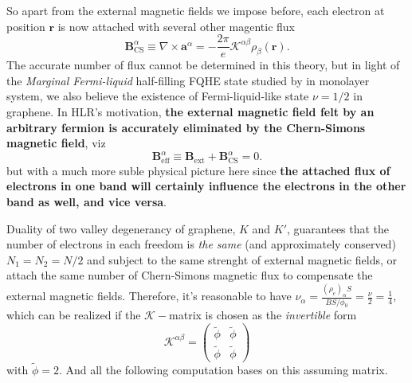 \documentclass[bachelor,english,numbers]{ustcthesis}
\begin{document}
		So apart from the external magnetic fields we impose before, each electron at position $\bm{r}$ is now attached with several other magentic flux
		\begin{equation}\label{2.2.5}
			\bm{B}^\alpha_{\text{CS}}\equiv\nabla\times\bm{a}^\alpha=-\dfrac{2\pi}{e}\mathcal{K}^{\alpha \beta}\rho_\beta(\bm{r}).
		\end{equation}
		The accurate number of flux cannot be determined in this theory, but in light of the \emph{Marginal Fermi-liquid} half-filling FQHE state studied by \cite{Halperin1995Theory} in monolayer system, we also believe the existence of Fermi-liquid-like state $\nu=1/2$ in graphene. In HLR's motivation, {\bf the external magnetic field felt by an arbitrary fermion is accurately eliminated by the Chern-Simons magnetic field}, viz
		\begin{equation}\label{2.2.6}
			\bm{B}^\alpha_{\text{eff}}\equiv\bm{B}_{\text{ext}}+\bm{B}^\alpha_{\text{CS}}=0.
		\end{equation}
		but with a much more suble physical picture here since {\bf the attached flux of electrons in one band will certainly influence the electrons in the other band as well, and vice versa}.\par
		Duality of two valley degenerancy of graphene, $K$ and $K'$, guarantees that the number of electrons in each freedom is \emph{the same} (and approximately conserved) $N_1=N_2=N/2$ and subject to the same strenght of external magnetic fields, or attach the same number of Chern-Simons magnetic flux to compensate the external magnetic fields. Therefore, it's reasonable to have $\nu_\alpha=\frac{(\rho_e)_{\alpha}S}{BS/\phi_0}=\frac{\nu}{2}=\frac{1}{4}$, which can be realized if the $\mathcal{K}-$matrix is chosen as the \emph{invertible} form
		\begin{equation}\label{2.2.7}
			\mathcal{K}^{\alpha \beta}=\left(\begin{array}{cc}
				\widetilde{\phi}  & \widetilde{\phi}  \\ \widetilde{\phi}  & \widetilde{\phi} 
			\end{array}\right)
		\end{equation}
		with $\widetilde{\phi}=2$. And all the following computation bases on this assuming matrix.
\end{document}
